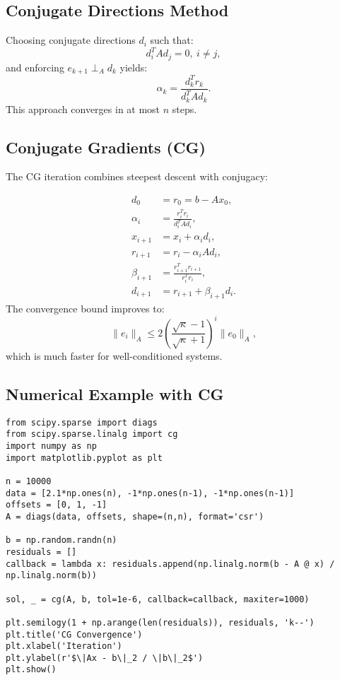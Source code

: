 \documentclass[11pt,a4paper]{book}
\begin{document}
\subsection*{Conjugate Directions Method}
Choosing conjugate directions \(d_i\) such that:
\[
d_i^T A d_j = 0,\ i \neq j,
\]
and enforcing \(e_{k+1} \perp_A d_k\) yields:
\[
\alpha_k = \frac{d_k^T r_k}{d_k^T A d_k}.
\]
This approach converges in at most \(n\) steps.

\subsection*{Conjugate Gradients (CG)}
The CG iteration combines steepest descent with conjugacy:

\[
\begin{aligned}
d_0 &= r_0 = b - A x_0,\\
\alpha_i &= \frac{r_i^T r_i}{d_i^T A d_i},\\
x_{i+1} &= x_i + \alpha_i d_i,\\
r_{i+1} &= r_i - \alpha_i A d_i,\\
\beta_{i+1} &= \frac{r_{i+1}^T r_{i+1}}{r_i^T r_i},\\
d_{i+1} &= r_{i+1} + \beta_{i+1} d_i.
\end{aligned}
\]
The convergence bound improves to:
\[
\|e_i\|_A \le 2 \left( \frac{\sqrt{\kappa} - 1}{\sqrt{\kappa} + 1} \right)^i \|e_0\|_A,
\]
which is much faster for well-conditioned systems.

\subsection*{Numerical Example with CG}
\begin{lstlisting}
from scipy.sparse import diags
from scipy.sparse.linalg import cg
import numpy as np
import matplotlib.pyplot as plt

n = 10000
data = [2.1*np.ones(n), -1*np.ones(n-1), -1*np.ones(n-1)]
offsets = [0, 1, -1]
A = diags(data, offsets, shape=(n,n), format='csr')

b = np.random.randn(n)
residuals = []
callback = lambda x: residuals.append(np.linalg.norm(b - A @ x) / np.linalg.norm(b))

sol, _ = cg(A, b, tol=1e-6, callback=callback, maxiter=1000)

plt.semilogy(1 + np.arange(len(residuals)), residuals, 'k--')
plt.title('CG Convergence')
plt.xlabel('Iteration')
plt.ylabel(r'$\|Ax - b\|_2 / \|b\|_2$')
plt.show()
\end{lstlisting}
\end{document}
